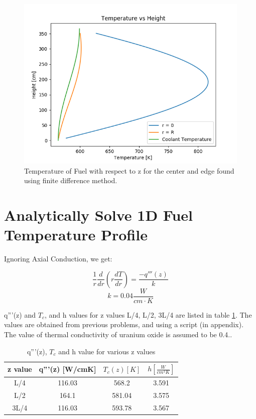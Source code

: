 \documentclass[12pt,letterpaper]{article}
\begin{document}
\begin{figure}[htbp!]
    \begin{center}
        \includegraphics[scale=0.7]{numerical2.png}
    \end{center}
    \caption{Temperature of Fuel with respect to z for the center and edge found using finite difference method.}
    \label{fig:numer2}
\end{figure}


\section*{Analytically Solve 1D Fuel Temperature Profile}
Ignoring Axial Conduction, we get:

\[\frac{1}{r} \frac{d}{dr} (r \frac{dT}{dr}) = \frac{-q'''(z)}{k}\]
\[k = 0.04 \frac{W}{cm\cdot K}\]

q'''(z) and $T_c$, and h  values for z values L/4, L/2, 3L/4 are listed in table \ref{tab:q_vol}.
The values are obtained from previous problems, and using a script (in appendix).
The value of thermal conductivity of uranium oxide is assumed
to be 0.4.\cite{ronchi_thermal_1999}.

\begin{table}[h]
     \centering
    \begin{tabular}{cccc}
       \hline
       z value & q'''(z) [W/cmK] & $T_c(z) [K]$ & $h [\frac{W}{cm^2 K}] $ \\
       \hline
       L/4 & 116.03 & 568.2 & 3.591 \\
       L/2 & 164.1 & 581.04 & 3.575 \\
       3L/4 & 116.03 & 593.78 & 3.567 \\
       \hline
    \end{tabular}
    \caption {q'''(z), $T_c$ and h value for various z values}
    \label{tab:q_vol}
\end{table}
\end{document}
